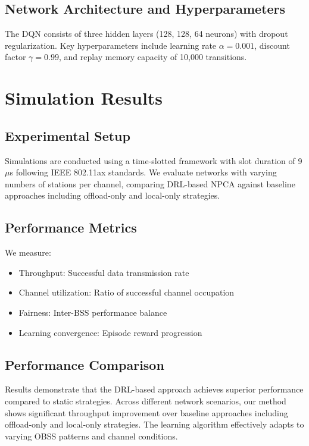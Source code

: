\documentclass[conference]{IEEEtran}
\begin{document}
\subsection{Network Architecture and Hyperparameters}

The DQN consists of three hidden layers (128, 128, 64 neurons) with dropout regularization. Key hyperparameters include learning rate $\alpha = 0.001$, discount factor $\gamma = 0.99$, and replay memory capacity of 10,000 transitions.

\section{Simulation Results}

\subsection{Experimental Setup}

Simulations are conducted using a time-slotted framework with slot duration of 9 $\mu$s following IEEE 802.11ax standards. We evaluate networks with varying numbers of stations per channel, comparing DRL-based NPCA against baseline approaches including offload-only and local-only strategies.

\subsection{Performance Metrics}

We measure:
\begin{itemize}
\item Throughput: Successful data transmission rate
\item Channel utilization: Ratio of successful channel occupation
\item Fairness: Inter-BSS performance balance
\item Learning convergence: Episode reward progression
\end{itemize}

\subsection{Performance Comparison}

Results demonstrate that the DRL-based approach achieves superior performance compared to static strategies. Across different network scenarios, our method shows significant throughput improvement over baseline approaches including offload-only and local-only strategies. The learning algorithm effectively adapts to varying OBSS patterns and channel conditions.
\end{document}
